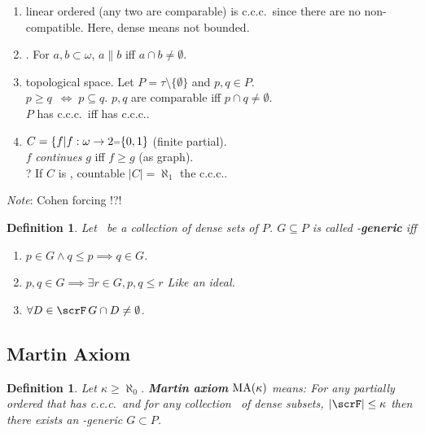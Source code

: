 \documentclass[11pt,pdftex,twoside,a4paper]{article}
\newcommand{\B}[1]{\textbf{#1}}
\newcommand{\ccc}{c.c.c.}
\newcommand{\MA}{\mathop{\rm MA}\nolimits}
\newtheorem{ldef}[thm]{Definition}
\begin{document}
\begin{enumerate}
\item {} linear ordered (any two are comparable)
is \ccc\ since there are no non-compatible.
Here, dense means not bounded.

\item {}. %
For \(a,b\subset \omega\), \(a\|b\) iff \(a\cap b \neq \emptyset\).

\item {} topological space.
Let \(P = \tau \setminus \{\emptyset\}\) and \(p,q \in P\).\\
\(p \geq q\ \;\iff\; p \subseteq q\).
\(p,q\) are comparable iff \(p\cap q\neq \emptyset\).\\
$P$ has \ccc\ iff  has \ccc.

\item \(C = \{f| f: \omega \to 2 \mathsmaller=\{0,1\}\)
(finite partial).\\
$f$ \emph{continues} $g$ iff  \(f \geq g\) (as graph).\\
? If $C$ is , countable \(|C| = \aleph_1\) the \ccc.
\end{enumerate}

\emph{Note}: Cohen forcing !?!

\begin{ldef}
Let \scrF\ be a collection of dense sets of $P$.
\(G \subseteq P\) is called \scrF-\B{generic} iff 
\begin{enumerate}
\item \(p\in G \land q\leq p \implies q \in G\).
\item \(p,q \in G \implies \exists r\in G, p,q\leq r\) Like an ideal.
\item \(\forall D \in \scrF\, G\cap D \neq \emptyset\).
\end{enumerate}
\end{ldef}

\subsection{Martin Axiom}

\begin{ldef}
Let \(\kappa \geq \aleph_0\).
\B{Martin axiom} \(\MA(\kappa)\) means:
For any partially ordered  that has \ccc\
and for any collection \scrF\ of dense subsets, \(|\scrF| \leq \kappa\)
then there exists an \scrF-generic \(G\subset P\).
\end{ldef}
\end{document}
